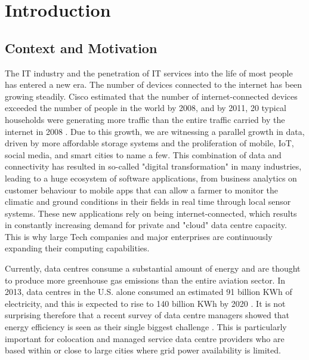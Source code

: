 \chapter{Introduction}
\label{chapter:introduction}

\section{Context and Motivation}

The IT industry and the penetration of IT services into the life of most people has entered a new era. The number of devices connected to the internet has been growing steadily.  Cisco estimated that the number of internet-connected devices exceeded the number of people in the world by 2008, and by 2011, 20 typical households were generating more traffic than the entire traffic carried by the internet in 2008 \cite{evans2008-iotinfo}. Due to this growth, we are witnessing a parallel growth in data, driven by more affordable storage systems and the proliferation of mobile, IoT, social media, and smart cities to name a few.  This combination of data and connectivity has resulted in so-called "digital transformation" in many industries, leading to a huge ecosystem of software applications, from business analytics on customer behaviour to mobile apps that can allow a farmer to monitor the climatic and ground conditions in their fields in real time through local sensor systems. These new applications rely on being internet-connected, which results in constantly increasing demand for private and "cloud" data centre capacity.  This is why large Tech companies and major enterprises are continuously expanding their computing capabilities. 

Currently, data centres consume a substantial amount of energy and are thought to produce more greenhouse gas emissions than the entire aviation sector. In 2013, data centres in the U.S. alone consumed an estimated 91 billion KWh of electricity, and this is expected to rise to 140 billion KWh by 2020 \cite{delforge2014-datacentreenergy}. It is not surprising therefore that a recent survey of data centre managers showed that energy efficiency is seen as their single biggest challenge \cite{cainc2016-ausdcenergy}. This is particularly important for colocation and managed service data centre providers who are based within or close to large cities where grid power availability is limited.

